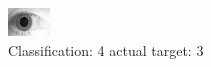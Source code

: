\begin{figure}[h!]
\begin{center}
\includegraphics[width=0.60\columnwidth]{figures/ID1937_class_4_target_3.png}
\end{center}
\caption{ Classification: 4 actual target: 3}
\label{fig:ID1937_class_4_target_3}
\end{figure}
